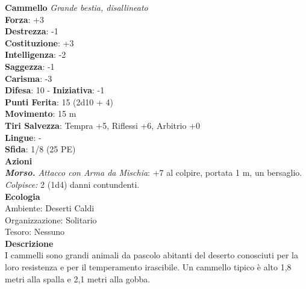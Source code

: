 \begin{multicols}{2}
\medskip\textbf{Cammello}
\emph{Grande bestia, disallineato}\\
\textbf{Forza}: +3\\
\textbf{Destrezza}: -1\\
\textbf{Costituzione}: +3\\
\textbf{Intelligenza}: -2\\
\textbf{Saggezza}: -1\\
\textbf{Carisma}: -3\\
\textbf{Difesa}: 10 - \textbf{Iniziativa}: -1\\
\textbf{Punti Ferita}: 15 (2d10 + 4)\\
\textbf{Movimento}: 15 m\\
\textbf{Tiri Salvezza}: Tempra +5, Riflessi +6, Arbitrio +0 \\
\textbf{Lingue}: -\\
\textbf{Sfida}: 1/8 (25 PE)\smallskip\\
\smallskip\textbf{Azioni}\\
\emph{\textbf{Morso.} Attacco con Arma da Mischia}: +7 al colpire, portata 1 m, un bersaglio.\\
\emph{Colpisce:} 2 (1d4) danni contundenti.\\
\textbf{Ecologia}\\
Ambiente: Deserti Caldi\\
Organizzazione: Solitario\\
Tesoro: Nessuno\\
\textbf{Descrizione}\\
I cammelli sono grandi animali da pascolo abitanti del deserto conosciuti per la loro resistenza e per il temperamento irascibile. Un cammello tipico è alto 1,8 metri alla spalla e 2,1 metri alla gobba. \\


\end{multicols}
